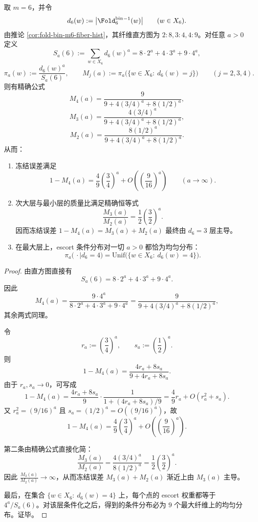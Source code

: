\begin{theorem}\label{thm:derived-window6-escort-freezing-max-layer-rate}
取 \(m=6\)，并令
\[
d_6(w):=\bigl|\Fold_6^{\mathrm{bin}}{}^{-1}(w)\bigr|
\qquad (w\in X_6).
\]
由推论 \ref{cor:fold-bin-m6-fiber-hist}，其纤维直方图为 \(2:8,3:4,4:9\)。对任意 \(a>0\) 定义
\[
S_a(6):=\sum_{w\in X_6} d_6(w)^a
=
8\cdot 2^a+4\cdot 3^a+9\cdot 4^a,
\]
\[
\pi_a(w):=\frac{d_6(w)^a}{S_a(6)},
\qquad
M_j(a):=\pi_a\bigl(\{w\in X_6:\ d_6(w)=j\}\bigr)
\qquad (j=2,3,4).
\]
则有精确公式
\[
M_4(a)=\frac{9}{9+4(3/4)^a+8(1/2)^a},
\]
\[
M_3(a)=\frac{4(3/4)^a}{9+4(3/4)^a+8(1/2)^a},
\]
\[
M_2(a)=\frac{8(1/2)^a}{9+4(3/4)^a+8(1/2)^a}.
\]
从而：
\begin{enumerate}
  \item 冻结误差满足
  \[
  1-M_4(a)=\frac{4}{9}\left(\frac34\right)^a+O\!\left(\left(\frac{9}{16}\right)^a\right)
  \qquad (a\to\infty).
  \]
  \item 次大层与最小层的质量比满足精确恒等式
  \[
  \frac{M_3(a)}{M_2(a)}=\frac12\left(\frac32\right)^a.
  \]
  因而冻结误差 \(1-M_4(a)=M_3(a)+M_2(a)\) 最终由 \(d_6=3\) 层主导。
  \item 在最大层上，escort 条件分布对一切 \(a>0\) 都恰为均匀分布：
  \[
  \pi_a\bigl(\,\cdot\mid d_6=4\bigr)
  =
  \mathrm{Unif}\bigl(\{w\in X_6:\ d_6(w)=4\}\bigr).
  \]
\end{enumerate}
\end{theorem}
\begin{proof}
由直方图直接有
\[
S_a(6)=8\cdot 2^a+4\cdot 3^a+9\cdot 4^a.
\]
因此
\[
M_4(a)=\frac{9\cdot 4^a}{8\cdot 2^a+4\cdot 3^a+9\cdot 4^a}
=
\frac{9}{9+4(3/4)^a+8(1/2)^a},
\]
其余两式同理。

令
\[
r_a:=\left(\frac34\right)^a,
\qquad
s_a:=\left(\frac12\right)^a.
\]
则
\[
1-M_4(a)=\frac{4r_a+8s_a}{9+4r_a+8s_a}.
\]
由于 \(r_a,s_a\to 0\)，可写成
\[
1-M_4(a)
=
\frac{4r_a+8s_a}{9}\cdot \frac{1}{1+(4r_a+8s_a)/9}
=
\frac{4}{9}r_a+O(r_a^2+s_a).
\]
又 \(r_a^2=(9/16)^a\) 且 \(s_a=(1/2)^a=O((9/16)^a)\)，故
\[
1-M_4(a)=\frac49\left(\frac34\right)^a+O\!\left(\left(\frac{9}{16}\right)^a\right).
\]

第二条由精确公式直接化简：
\[
\frac{M_3(a)}{M_2(a)}
=
\frac{4(3/4)^a}{8(1/2)^a}
=
\frac12\left(\frac32\right)^a.
\]
因此 \(\frac{M_3(a)}{M_2(a)}\to\infty\)，从而冻结误差 \(M_3(a)+M_2(a)\) 渐近上由 \(M_3(a)\) 主导。

最后，在集合 \(\{w\in X_6:\ d_6(w)=4\}\) 上，每个点的 escort 权重都等于 \(4^a/S_a(6)\)。对该层条件化之后，得到的条件分布必为 \(9\) 个最大纤维上的均匀分布。证毕。
\end{proof}
